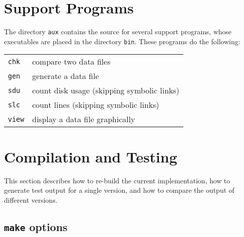 \section{Support Programs\label{s:support}}

The directory {\tt{aux}} contains the source for several support programs,
whose executables are placed in the directory {\tt{bin}}.
These programs do the following:
\begin{small}\begin{center}\begin{tabular}{ll}
{\tt{chk}}	& compare two data files\\
{\tt{gen}}	& generate a data file\\
{\tt{sdu}}	& count disk usage (skipping symbolic links)\\
{\tt{slc}}	& count lines (skipping symbolic links)\\
{\tt{view}}	& display a data file graphically
\end{tabular}\end{center}\end{small}

\section{Compilation and Testing\label{s:make}}

This section describes how to re-build the current implementation,
how to generate test output for a single version,
and how to compare the output of different versions.

\subsection{{\tt{make}} options\label{s:make-cmpl}}

